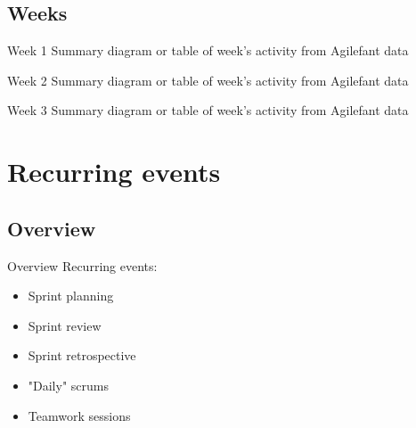 \documentclass{beamer}
\begin{document}
\subsection{Weeks}
\begin{frame}{Week 1}
  Summary diagram or table of week's activity from Agilefant data
\end{frame}
\begin{frame}{Week 2}
  Summary diagram or table of week's activity from Agilefant data
\end{frame}
\begin{frame}{Week 3}
  Summary diagram or table of week's activity from Agilefant data
\end{frame}
\section{Recurring events} %
\subsection{Overview}
\begin{frame}{Overview}
  Recurring events:

  \begin{itemize}
  \item Sprint planning
  \item Sprint review
  \item Sprint retrospective
  \item "Daily" scrums
  \item Teamwork sessions
  \end{itemize}
\end{frame}
\end{document}
